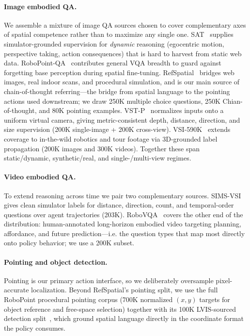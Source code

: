 \paragraph{Image embodied QA.}
We assemble a mixture of image QA sources chosen to cover complementary axes
of spatial competence rather than to maximize any single one.
SAT~\citep{ray2025satdynamicspatialaptitude} supplies simulator-grounded
supervision for \emph{dynamic} reasoning (egocentric motion, perspective
taking, action consequences) that is hard to harvest from static web data.
RoboPoint-QA~\citep{yuan2024robopoint} contributes general VQA breadth to
guard against forgetting base perception during spatial fine-tuning.
RefSpatial~\citep{zhou2025roborefer} bridges web
images, real indoor scans, and procedural simulation, and is our main source
of chain-of-thought referring---the bridge from spatial language to
the pointing actions used downstream; we draw 250K multiple choice questions, 250K Chian-of-thought, and 80K
pointing examples. VST-P~\citep{yang2025visualspatialtuning} normalizes
inputs onto a uniform virtual camera, giving metric-consistent depth,
distance, direction, and size supervision (200K single-image + 200K
cross-view). VSI-590K~\citep{yang2025cambriansspatialsupersensingvideo}
extends coverage to in-the-wild robotics and tour footage via 3D-grounded
label propagation (200K images and 300K videos). Together these span static/dynamic, synthetic/real, and single-/multi-view regimes.

\paragraph{Video embodied QA.}
To extend reasoning across time we pair two complementary sources.
SIMS-VSI~\citep{brown2025simsvsimulatedinstructiontuningspatial} gives clean
simulator labels for distance, direction, count, and temporal-order
questions over agent trajectories (203K). RoboVQA~\citep{sermanet2023robovqamultimodallonghorizonreasoning}
covers the other end of the distribution: human-annotated long-horizon
embodied video targeting planning, affordance, and future prediction---i.e.
the question types that map most directly onto policy
behavior; we use a 200K subset.


\paragraph{Pointing and object detection.}
Pointing is our primary action interface, so we deliberately oversample
pixel-accurate localization. Beyond RefSpatial's pointing split, we use the
full RoboPoint procedural pointing corpus (700K normalized $(x,y)$ targets
for object reference and free-space selection) together with its 100K
LVIS-sourced detection split~\citep{yuan2024robopoint}, which ground spatial
language directly in the coordinate format the policy
consumes.


